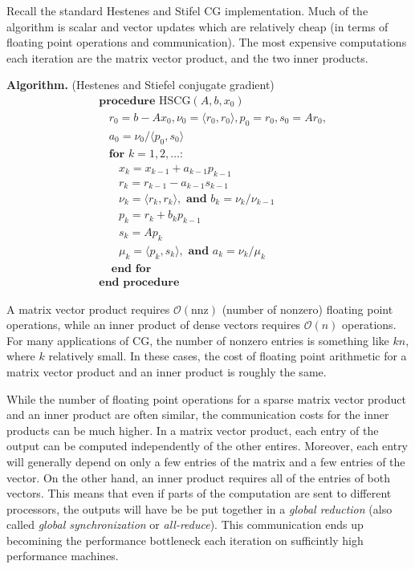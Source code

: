 \documentclass[10pt]{article}
\begin{document}
Recall the standard Hestenes and Stifel CG implementation.
Much of the algorithm is scalar and vector updates which are relatively cheap (in terms of floating point operations and communication).
The most expensive computations each iteration are the matrix vector product, and the two inner products.

\textbf{Algorithm.} (Hestenes and Stiefel conjugate gradient)
\begin{align*}
&\textbf{procedure}\text{ HSCG}( A,b,x_0 ) 
\\[-.4em]&~~~~r_0 = b-Ax_0, \nu_0 = \langle r_0,r_0 \rangle, p_0 = r_0, s_0 = Ar_0, 
\\[-.4em]&~~~~a_0 = \nu_0 / \langle p_0,s_0 \rangle
\\[-.4em]&~~~~\textbf{for } k=1,2,\ldots \textbf{:} 
\\[-.4em]&~~~~~~~~x_k = x_{k-1} + a_{k-1} p_{k-1} 
\\[-.4em]&~~~~~~~~r_k = r_{k-1} - a_{k-1} s_{k-1} 
\\[-.4em]&~~~~~~~~\nu_{k} = \langle r_k,r_k \rangle, \textbf{ and } b_k = \nu_k / \nu_{k-1}
\\[-.4em]&~~~~~~~~p_k = r_k + b_k p_{k-1}
\\[-.4em]&~~~~~~~~s_k = A p_k
\\[-.4em]&~~~~~~~~\mu_k = \langle p_k,s_k \rangle, \textbf{ and } a_k = \nu_k / \mu_k
\\[-.4em]&~~~~~\textbf{end for}
\\[-.4em]&\textbf{end procedure}
\end{align*}

A matrix vector product requires \(\mathcal{O}(\text{nnz})\) (number of nonzero) floating point operations, while an inner product of dense vectors requires \(\mathcal{O}(n)\) operations.
For many applications of CG, the number of nonzero entries is something like \(kn\), where \(k\) relatively small.
In these cases, the cost of floating point arithmetic for a matrix vector product and an inner product is roughly the same.

While the number of floating point operations for a sparse matrix vector product and an inner product are often similar, the communication costs for the inner products can be much higher.
In a matrix vector product, each entry of the output can be computed independently of the other entires. Moreover, each entry will generally depend on only a few entries of the matrix and a few entries of the vector.
On the other hand, an inner product requires all of the entries of both vectors.
This means that even if parts of the computation are sent to different processors, the outputs will have be be put together in a \emph{global reduction} (also called \emph{global synchronization} or \emph{all-reduce}).
This communication ends up becomining the performance bottleneck each iteration on sufficintly high performance machines.
\end{document}
